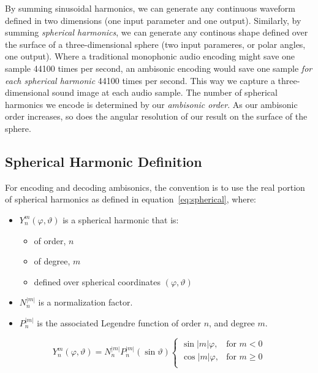 By summing sinusoidal harmonics, we can generate any continuous
waveform defined in two dimensions (one input parameter and one
output). Similarly, by summing \emph{spherical harmonics}, we can
generate any continous shape defined over the surface of a
three-dimensional sphere (two input parameres, or polar angles, one
output). Where a traditional monophonic audio encoding might save one
sample 44100 times per second, an ambisonic encoding would save one
sample \emph{for each spherical harmonic} 44100 times per second. This
way we capture a three-dimensional sound image at each audio sample.
The number of spherical harmonics we encode is determined by our
\textit{ambisonic order}. As our ambisonic order increases, so does
the angular resolution of our result on the surface of the sphere.

\subsection{Spherical Harmonic Definition}
For encoding and decoding ambisonics, the convention is to use the
real portion of spherical harmonics as defined in
equation~\ref{eq:spherical}, where:
\begin{itemize}
\item $Y_{n}^{m}(\varphi,\vartheta)$ is a spherical harmonic that
is:
\begin{itemize}
\item of order, $n$
\item of degree, $m$
\item defined over spherical coordinates $(\varphi, \vartheta)$
\end{itemize}
\item $N_n^{|m|}$ is a normalization factor.\cite{Nachbar2011}
\item $P_n^{|m|}$ is the associated Legendre function of order $n$,
  and degree $m$.
\end{itemize}
\begin{equation}
Y_{n}^{m}(\varphi,\vartheta)=N_n^{|m|}P_n^{|m|}(\sin{\vartheta})
\begin{cases}\label{eq:spherical}
\sin{|m|\varphi},&  \text{for $m<0$}\\  
\cos{|m|\varphi},& \text{for $m\geq 0$}\\
\end{cases}
\end{equation}
